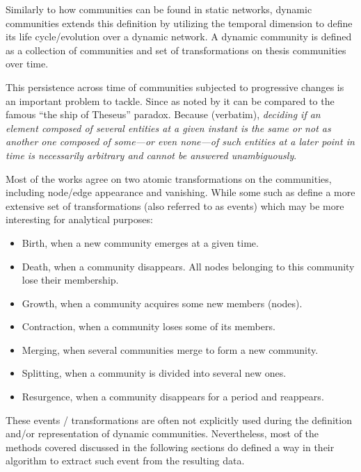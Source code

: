 \documentclass[
acmsmall,
nonacm,
screen,
acmthm]{../../scripts/pandoc/templates/acmart}
\providecommand{\tightlist}{%
\setlength{\itemsep}{0pt}\setlength{\parskip}{0pt}}
\begin{document}
Similarly to how communities can be found in static networks, dynamic
communities extends this definition by utilizing the temporal dimension
to define its life cycle/evolution over a dynamic network. A dynamic
community is defined as a collection of communities and set of
transformations on thesis communities over time.

This persistence across time of communities subjected to progressive
changes is an important problem to tackle. Since as noted by
\citep{rossettiCommunityDiscoveryDynamic2018} it can be compared to the
famous ``the ship of Theseus'' paradox. Because (verbatim),
\emph{deciding if an element composed of several entities at a given
instant is the same or not as another one composed of some---or even
none---of such entities at a later point in time is necessarily
arbitrary and cannot be answered unambiguously}.

Most of the works agree on two atomic transformations on the
communities, including node/edge appearance and vanishing. While some
such as
\citep[\citet{cazabetUsingDynamicCommunity2012}]{pallaQuantifyingSocialGroup2007, asurEventbasedFrameworkCharacterizing2009}
define a more extensive set of transformations (also referred to as
events) which may be more interesting for analytical purposes:

\begin{itemize}
\tightlist
\item
  Birth, when a new community emerges at a given time.~
\item
  Death, when a community disappears. All nodes belonging to this
  community lose their membership.
\item
  Growth, when a community acquires some new members (nodes).
\item
  Contraction, when a community loses some of its members.
\item
  Merging, when several communities merge to form a new community.
\item
  Splitting, when a community is divided into several new ones.
\item
  Resurgence, when a community disappears for a period and reappears.
\end{itemize}

These events / transformations are often not explicitly used during the
definition and/or representation of dynamic communities. Nevertheless,
most of the methods covered discussed in the following sections do
defined a way in their algorithm to extract such event from the
resulting data.
\end{document}

